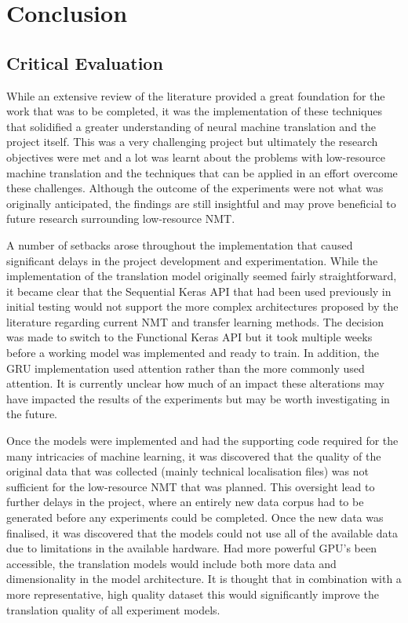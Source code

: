 \chapter{Conclusion}
\newpage
\section{Critical Evaluation}

While an extensive review of the literature provided a great foundation for the work that was to be completed, it was the implementation of these techniques that solidified a greater understanding of neural machine translation and the project itself.
This was a very challenging project but ultimately the research objectives were met and a lot was learnt about the problems with low-resource machine translation and the techniques that can be applied in an effort overcome these challenges. Although the outcome of the experiments were not what was originally anticipated, the findings are still insightful and may prove beneficial to future research surrounding low-resource \acrshort{NMT}.

A number of setbacks arose throughout the implementation that caused significant delays in the project development and experimentation. While the implementation of the translation model originally seemed fairly straightforward, it became clear that the Sequential Keras API that had been used previously in initial testing would not support the more complex architectures proposed by the literature regarding current \acrshort{NMT} and transfer learning methods. The decision was made to switch to the Functional Keras API but it took multiple weeks before a working model was implemented and ready to train. In addition, the \acrshort{GRU} implementation used \cite{bahdanau_neural_2016} attention rather than the more commonly used \cite{luong_effective_2015} attention. It is currently unclear how much of an impact these alterations may have impacted the results of the experiments but may be worth investigating in the future.

Once the models were implemented and had the supporting code required for the many intricacies of machine learning, it was discovered that the quality of the original data that was collected (mainly technical localisation files) was not sufficient for the low-resource \acrshort{NMT} that was planned. This oversight lead to further delays in the project, where an entirely new data corpus had to be generated before any experiments could be completed. Once the new data was finalised, it was discovered that the models could not use all of the available data due to limitations in the available hardware. Had more powerful GPU's been accessible, the translation models would include both more data and dimensionality in the model architecture. It is thought that in combination with a more representative, high quality dataset this would significantly improve the translation quality of all experiment models.

